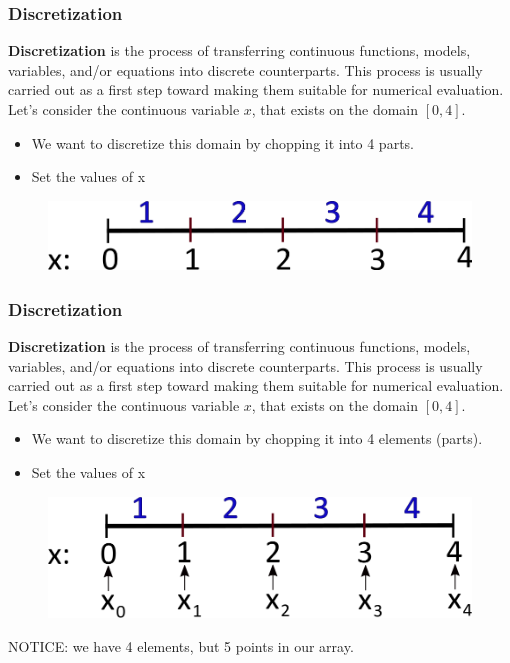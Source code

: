 \documentclass{if-beamer}
\begin{document}
\begin{frame}
\frametitle{Discretization}
\textbf{Discretization} is the process of transferring continuous functions, models, variables, and/or equations into discrete counterparts. This process is usually carried out as a first step toward making them suitable for numerical evaluation.\\
\vspace{5pt}
Let's consider the continuous variable $x$, that exists on the domain $[0,4]$. \\
\begin{itemize}
	\item We want to discretize this domain by chopping it into 4 parts.
	\item Set the values of x
\end{itemize}

\begin{figure}
	\centering
	\includegraphics[width = .8\textwidth]{figures/space3}
\end{figure}
\end{frame} 

\begin{frame}
\frametitle{Discretization}
\textbf{Discretization} is the process of transferring continuous functions, models, variables, and/or equations into discrete counterparts. This process is usually carried out as a first step toward making them suitable for numerical evaluation.\\
\vspace{5pt}
Let's consider the continuous variable $x$, that exists on the domain $[0,4]$. \\
\begin{itemize}
	\item We want to discretize this domain by chopping it into 4 elements (parts).
	\item Set the values of x\\
\end{itemize}

\begin{figure}
	\centering
	\includegraphics[width = .8\textwidth]{figures/space4}
\end{figure}

\vspace{5pt}
NOTICE: we have 4 elements, but 5 points in our array. 
\end{frame} 
\end{document}
